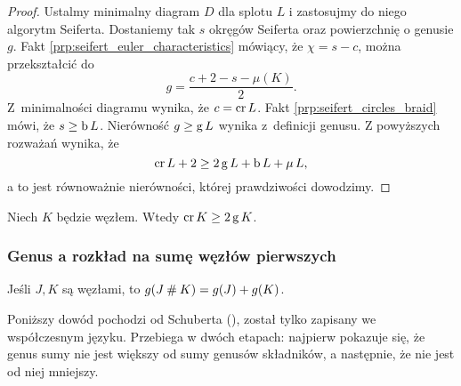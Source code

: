 \begin{proof}
    Ustalmy minimalny diagram $D$ dla splotu $L$ i zastosujmy do niego algorytm Seiferta.
    Dostaniemy tak $s$ okręgów Seiferta oraz powierzchnię o genusie $g$.
    Fakt \ref{prp:seifert_euler_characteristics} mówiący, że $\chi = s - c$, można przekształcić do
    \begin{equation}
        g = \frac{c + 2 - s - \mu(K)}{2}.
    \end{equation}
    Z~minimalności diagramu wynika, że $c = \operatorname{cr} L$.
    Fakt \ref{prp:seifert_circles_braid} mówi, że $s \ge \operatorname{b} L$.
    Nierówność $g \ge \operatorname{g} L$ wynika z~definicji genusu.
    Z powyższych rozważań wynika, że
    \begin{equation}
        \operatorname{cr} L + 2 \ge 2 \operatorname{g} L + \operatorname{b} L + \operatorname{\mu} L,
    \end{equation}
    a to jest równoważnie nierówności, której prawdziwości dowodzimy.
\end{proof}

\begin{corollary}
    \label{cor:crossing_genus}
    Niech $K$ będzie węzłem.
    Wtedy $\operatorname{cr} K \ge 2 \operatorname{g} K$.
\end{corollary}

\subsubsection{Genus a rozkład na sumę węzłów pierwszych}

\begin{proposition}
    \label{prp:genus_of_sum}
    Jeśli $J, K$ są węzłami, to $g (J \mathbin{\#} K) = g(J) + g(K)$.
\end{proposition}

Poniższy dowód pochodzi od Schuberta (\cite{schubert49}), został tylko zapisany we współczesnym języku.
Przebiega w dwóch etapach: najpierw pokazuje się, że genus sumy nie jest większy od sumy genusów składników, a następnie, że nie jest od niej mniejszy.

